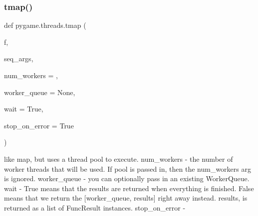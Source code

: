 \subsubsection{\texorpdfstring{tmap()}{tmap()}}
{\footnotesize\ttfamily def pygame.\+threads.\+tmap (\begin{DoxyParamCaption}\item[{}]{f,  }\item[{}]{seq\+\_\+args,  }\item[{}]{num\+\_\+workers = {},  }\item[{}]{worker\+\_\+queue = {\ttfamily None},  }\item[{}]{wait = {\ttfamily True},  }\item[{}]{stop\+\_\+on\+\_\+error = {\ttfamily True} }\end{DoxyParamCaption})}

\begin{DoxyVerb}like map, but uses a thread pool to execute.
    num_workers - the number of worker threads that will be used.  If pool
                    is passed in, then the num_workers arg is ignored.
    worker_queue - you can optionally pass in an existing WorkerQueue.
    wait - True means that the results are returned when everything is finished.
           False means that we return the [worker_queue, results] right away instead. 
           results, is returned as a list of FuncResult instances.
    stop_on_error - 
\end{DoxyVerb}
 